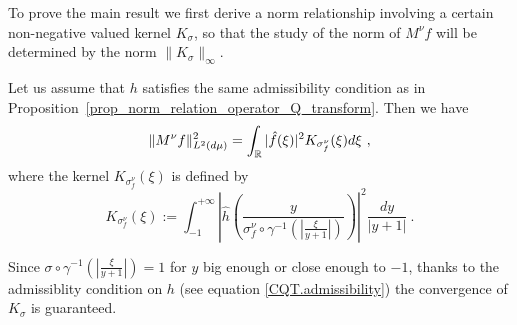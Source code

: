 To prove the main result we first derive a norm relationship involving a certain non-negative valued kernel $K_\sigma$, so that the study of the norm of $M^\nu f$ will be determined by the norm $\|K_\sigma\|_\infty$.
\begin{prop}
	Let us assume that $h$ satisfies the same admissibility condition as in  Proposition~\ref{prop_norm_relation_operator_Q_transform}. Then we have
	\begin{equation}
		\|M^\nu f\|_{L^2(d\mu)}^2 = \int_{\mathbb{R}} |\hat{f}(\xi)|^2 K_{\sigma_f^\nu}(\xi)d\xi\ ,
	\end{equation}
	where the kernel $K_{\sigma_f^\nu}(\xi)$ is defined by 
	\begin{equation}\label{kernel_frequency_case}
		K_{\sigma_f^\nu}(\xi) := \int_{-1}^{+\infty} \left|\hat{h}\left( \frac{y}{\sigma_f^\nu\circ\gamma^{-1}(|\frac{\xi}{y+1}|)} \right)\right|^2\frac{dy}{|y+1|}\ .
	\end{equation}
\end{prop}
\begin{remark}
Since $\sigma\circ\gamma^{-1}(|\frac{\xi}{y+1}|)=1$ for $y$ big enough or close enough to $-1$, thanks to the admissiblity condition on $h$  (see equation \ref{CQT.admissibility}) the convergence of $K_\sigma$ is guaranteed.
\end{remark}
